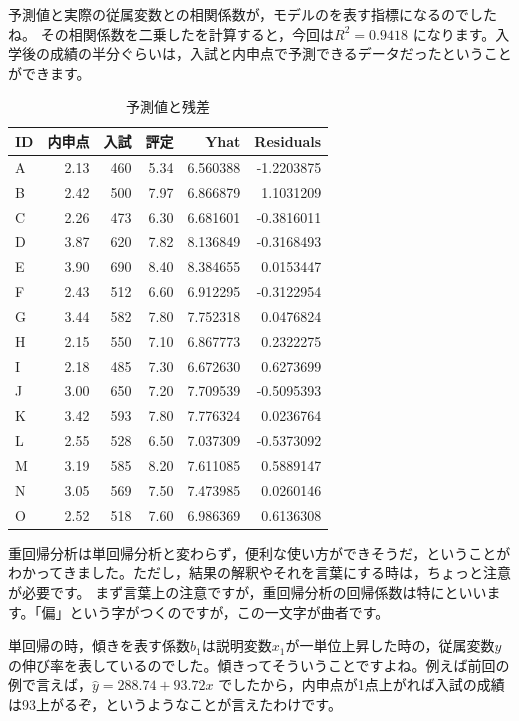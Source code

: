 \documentclass{ltjbook}
\begin{document}
予測値と実際の従属変数との相関係数が，モデルのを表す指標になるのでしたね。
その相関係数を二乗したを計算すると，今回は$R^2=0.9418$ になります。入学後の成績の半分ぐらいは，入試と内申点で予測できるデータだったということができます。
\begin{table}
    \caption{予測値と残差}
    \centering
    \begin{tabular}[t]{l|rrr|rr}
    \hline
    ID & 内申点 & 入試 & 評定 & Yhat & Residuals\\
    \hline
    A & 2.13 & 460 & 5.34 & 6.560388 & -1.2203875\\
    B & 2.42 & 500 & 7.97 & 6.866879 & 1.1031209\\
    C & 2.26 & 473 & 6.30 & 6.681601 & -0.3816011\\
    D & 3.87 & 620 & 7.82 & 8.136849 & -0.3168493\\
    E & 3.90 & 690 & 8.40 & 8.384655 & 0.0153447\\
    F & 2.43 & 512 & 6.60 & 6.912295 & -0.3122954\\
    G & 3.44 & 582 & 7.80 & 7.752318 & 0.0476824\\
    H & 2.15 & 550 & 7.10 & 6.867773 & 0.2322275\\
    I & 2.18 & 485 & 7.30 & 6.672630 & 0.6273699\\
    J & 3.00 & 650 & 7.20 & 7.709539 & -0.5095393\\
    K & 3.42 & 593 & 7.80 & 7.776324 & 0.0236764\\
    L & 2.55 & 528 & 6.50 & 7.037309 & -0.5373092\\
    M & 3.19 & 585 & 8.20 & 7.611085 & 0.5889147\\
    N & 3.05 & 569 & 7.50 & 7.473985 & 0.0260146\\
    O & 2.52 & 518 & 7.60 & 6.986369 & 0.6136308\\
    \hline
    \end{tabular}
    \label{tbl::10_02}
    \end{table}

重回帰分析は単回帰分析と変わらず，便利な使い方ができそうだ，ということがわかってきました。ただし，結果の解釈やそれを言葉にする時は，ちょっと注意が必要です。
まず言葉上の注意ですが，重回帰分析の回帰係数は特にといいます。「偏」という字がつくのですが，この一文字が曲者です。

単回帰の時，傾きを表す係数$b_1$は説明変数$x_1$が一単位上昇した時の，従属変数$y$の伸び率を表しているのでした。傾きってそういうことですよね。例えば前回の例で言えば，$\hat{y}=288.74+93.72x$ でしたから，内申点が1点上がれば入試の成績は93上がるぞ，というようなことが言えたわけです。
\end{document}

